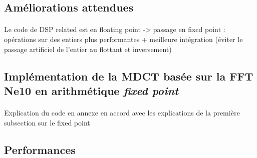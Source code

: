 \documentclass{article}
\begin{document}

    \subsection{Améliorations attendues}
    \paragraph{}
    Le code de DSP related est en floating point -> passage en fixed point : opérations sur des entiers plus performantes + meilleure intégration (éviter le passage artificiel de l'entier au flottant et inversement)




    \subsection{Implémentation de la MDCT basée sur la FFT Ne10 en arithmétique \emph{fixed point}}
    \paragraph{}
    Explication du code en annexe en accord avec les explications de la première subsection sur le fixed point

    \subsection{Performances}
\end{document}
